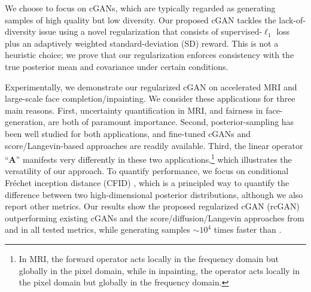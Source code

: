 \documentclass{article}
\theoremstyle{plain}
\theoremstyle{definition}
\theoremstyle{remark}
\renewcommand{\vec}[1]{\ensuremath{\boldsymbol{#1}}}
\begin{document}
We choose to focus on cGANs, which are typically regarded as generating samples of high quality but low diversity.
Our proposed cGAN tackles the lack-of-diversity issue using a novel regularization that consists of supervised-$\ell_1$ loss plus an adaptively weighted standard-deviation (SD) reward. 
This is not a heuristic choice; we prove that our regularization enforces consistency with the true posterior mean and covariance under certain conditions.

Experimentally, we demonstrate our regularized cGAN on accelerated MRI and large-scale face completion/inpainting. 
We consider these applications for three main reasons.
First, uncertainty quantification in MRI, and fairness in face-generation, are both of paramount importance. 
Second, posterior-sampling has been well studied for both applications, and fine-tuned cGANs \cite{Zhao:ICLR:21} and score/Langevin-based approaches \cite{Jalal:NIPS:21,Song:ICLR:21} are readily available.
Third, the linear operator ``$\vec{A}$'' manifests very differently in these two applications,\footnote{In MRI, the forward operator acts locally in the frequency domain but globally in the pixel domain, while in inpainting, the operator acts locally in the pixel domain but globally in the frequency domain.}
which illustrates the versatility of our approach.
To quantify performance, we focus on conditional Fr\'{e}chet inception distance (CFID) \cite{Soloveitchik:21}, 
which is a principled way to quantify the difference between two high-dimensional posterior distributions,
although we also report other metrics.
Our results show the proposed regularized cGAN (rcGAN) outperforming existing cGANs \cite{Adler:18,Ohayon:ICCVW:21,Zhao:ICLR:21} and the score/diffusion/Langevin approaches from \cite{Jalal:NIPS:21} and \cite{Song:ICLR:21} in all tested metrics, while generating samples $\sim 10^4$ times faster than \cite{Jalal:NIPS:21,Song:ICLR:21}.
\end{document}
